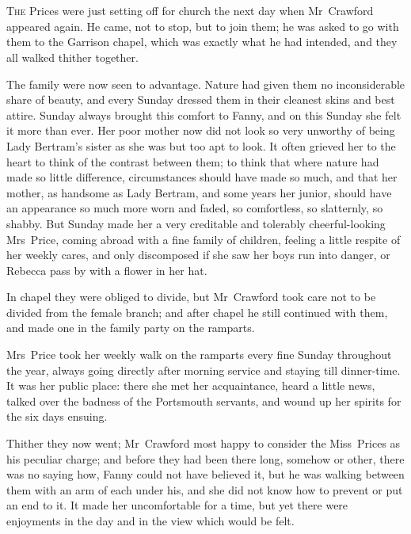 \chapter[Chapter \thechapter]{} 

 \lettrine[lraise=0.3]{T}{he} Prices were just setting off for church the next day when Mr~Crawford appeared again. He came, not to stop, but to join them; he was asked to go with them to the Garrison chapel, which was exactly what he had intended, and they all walked thither together.

The family were now seen to advantage. Nature had given them no inconsiderable share of beauty, and every Sunday dressed them in their cleanest skins and best attire. Sunday always brought this comfort to Fanny, and on this Sunday she felt it more than ever. Her poor mother now did not look so very unworthy of being Lady Bertram's sister as she was but too apt to look. It often grieved her to the heart to think of the contrast between them; to think that where nature had made so little difference, circumstances should have made so much, and that her mother, as handsome as Lady Bertram, and some years her junior, should have an appearance so much more worn and faded, so comfortless, so slatternly, so shabby. But Sunday made her a very creditable and tolerably cheerful-looking Mrs~Price, coming abroad with a fine family of children, feeling a little respite of her weekly cares, and only discomposed if she saw her boys run into danger, or Rebecca pass by with a flower in her hat.

In chapel they were obliged to divide, but Mr~Crawford took care not to be divided from the female branch; and after chapel he still continued with them, and made one in the family party on the ramparts.

Mrs~Price took her weekly walk on the ramparts every fine Sunday throughout the year, always going directly after morning service and staying till dinner-time. It was her public place: there she met her acquaintance, heard a little news, talked over the badness of the Portsmouth servants, and wound up her spirits for the six days ensuing.

Thither they now went; Mr~Crawford most happy to consider the Miss~Prices as his peculiar charge; and before they had been there long, somehow or other, there was no saying how, Fanny could not have believed it, but he was walking between them with an arm of each under his, and she did not know how to prevent or put an end to it. It made her uncomfortable for a time, but yet there were enjoyments in the day and in the view which would be felt.

